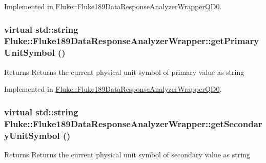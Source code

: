 Implemented in \hyperlink{classFluke_1_1Fluke189DataResponseAnalyzerWrapperQD0_af6e15c77a255dbebaaeb61e6848e8b42}{Fluke::Fluke189DataResponseAnalyzerWrapperQD0}.\hypertarget{classFluke_1_1Fluke189DataResponseAnalyzerWrapper_ab7559dd16cb4c1bda20ac54b4f93865b}{
\subsubsection[{getPrimaryUnitSymbol}]{\setlength{\rightskip}{0pt plus 5cm}virtual std::string Fluke::Fluke189DataResponseAnalyzerWrapper::getPrimaryUnitSymbol ()}}
\label{classFluke_1_1Fluke189DataResponseAnalyzerWrapper_ab7559dd16cb4c1bda20ac54b4f93865b}
\begin{DoxyReturn}{Returns}
Returns the current physical unit symbol of primary value as string 
\end{DoxyReturn}


Implemented in \hyperlink{classFluke_1_1Fluke189DataResponseAnalyzerWrapperQD0_af0968b6176ba724d21a89547147f9be5}{Fluke::Fluke189DataResponseAnalyzerWrapperQD0}.\hypertarget{classFluke_1_1Fluke189DataResponseAnalyzerWrapper_ab64cf61c2461f5150b0a0ad31ba689cc}{
\subsubsection[{getSecondaryUnitSymbol}]{\setlength{\rightskip}{0pt plus 5cm}virtual std::string Fluke::Fluke189DataResponseAnalyzerWrapper::getSecondaryUnitSymbol ()}}
\label{classFluke_1_1Fluke189DataResponseAnalyzerWrapper_ab64cf61c2461f5150b0a0ad31ba689cc}
\begin{DoxyReturn}{Returns}
Returns the current physical unit symbol of secondary value as string 
\end{DoxyReturn}


